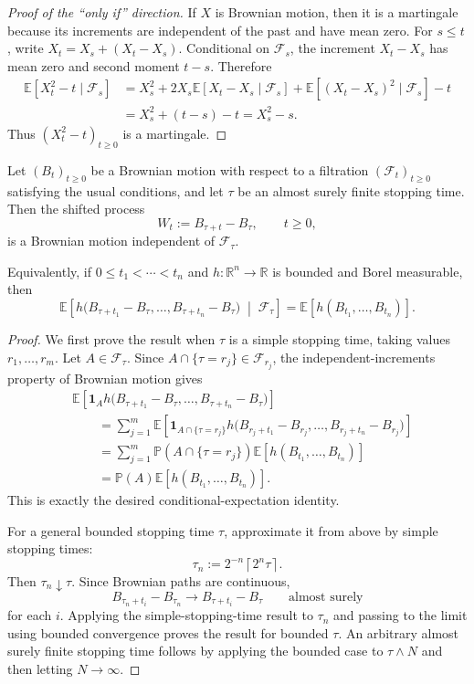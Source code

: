 \begin{proof}[Proof of the ``only if'' direction]
If $X$ is Brownian motion, then it is a martingale because its increments
are independent of the past and have mean zero. For $s\le t$, write
$X_t=X_s+(X_t-X_s)$. Conditional on $\mathcal{F}_s$, the increment
$X_t-X_s$ has mean zero and second moment $t-s$. Therefore
\begin{align*}
 \mathbb{E}[X_t^2-t\mid\mathcal{F}_s]
 &=X_s^2+2X_s\mathbb{E}[X_t-X_s\mid\mathcal{F}_s]
   +\mathbb{E}[(X_t-X_s)^2\mid\mathcal{F}_s]-t\\
 &=X_s^2+(t-s)-t=X_s^2-s.
\end{align*}
Thus $(X_t^2-t)_{t\ge0}$ is a martingale.
\end{proof}

\begin{theorem}
Let $(B_t)_{t\ge0}$ be a Brownian motion with respect to a filtration
$(\mathcal{F}_t)_{t\ge0}$ satisfying the usual conditions, and let $\tau$ be
an almost surely finite stopping time. Then the shifted process
\[
W_t:=B_{\tau+t}-B_\tau,\qquad t\ge0,
\]
is a Brownian motion independent of $\mathcal{F}_\tau$.

Equivalently, if $0\le t_1<\cdots<t_n$ and $h:\mathbb{R}^n\to\mathbb{R}$
is bounded and Borel measurable, then
\[
\mathbb{E}\!\left[
h\bigl(B_{\tau+t_1}-B_\tau,\ldots,B_{\tau+t_n}-B_\tau\bigr)
\;\middle|\; \mathcal{F}_\tau
\right]
=
\mathbb{E}\!\left[h(B_{t_1},\ldots,B_{t_n})\right].
\]
\end{theorem}

\begin{proof}
We first prove the result when $\tau$ is a simple stopping time, taking
values $r_1,\ldots,r_m$. Let $A\in\mathcal{F}_\tau$. Since
$A\cap\{\tau=r_j\}\in\mathcal{F}_{r_j}$, the independent-increments
property of Brownian motion gives
\[
\begin{aligned}
&\mathbb{E}\!\left[
\mathbf{1}_A
h\bigl(B_{\tau+t_1}-B_\tau,\ldots,B_{\tau+t_n}-B_\tau\bigr)
\right] \\
&\qquad =
\sum_{j=1}^m
\mathbb{E}\!\left[
\mathbf{1}_{A\cap\{\tau=r_j\}}
h\bigl(B_{r_j+t_1}-B_{r_j},\ldots,B_{r_j+t_n}-B_{r_j}\bigr)
\right] \\
&\qquad =
\sum_{j=1}^m
\mathbb{P}(A\cap\{\tau=r_j\})
\mathbb{E}\!\left[h(B_{t_1},\ldots,B_{t_n})\right] \\
&\qquad =
\mathbb{P}(A)\mathbb{E}\!\left[h(B_{t_1},\ldots,B_{t_n})\right].
\end{aligned}
\]
This is exactly the desired conditional-expectation identity.

For a general bounded stopping time $\tau$, approximate it from above by
simple stopping times:
\[
\tau_n:=2^{-n}\left\lceil 2^n\tau\right\rceil.
\]
Then $\tau_n\downarrow\tau$. Since Brownian paths are continuous,
\[
B_{\tau_n+t_i}-B_{\tau_n}
\longrightarrow
B_{\tau+t_i}-B_\tau
\qquad\text{almost surely}
\]
for each $i$. Applying the simple-stopping-time result to $\tau_n$ and
passing to the limit using bounded convergence proves the result for bounded
$\tau$. An arbitrary almost surely finite stopping time follows by applying
the bounded case to $\tau\wedge N$ and then letting $N\to\infty$.
\end{proof}

